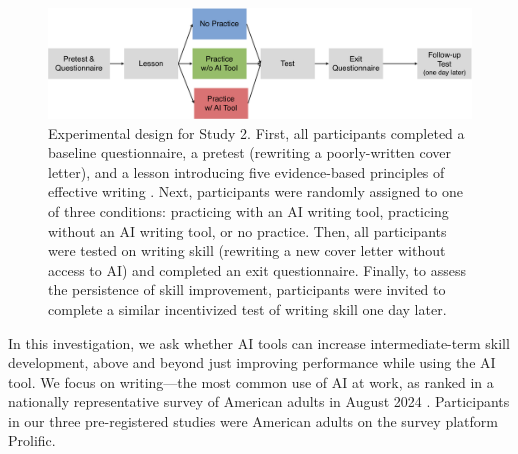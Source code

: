 \documentclass[11pt]{report}
\begin{document}
\begin{mainf}
\begin{figure}[]
    \centering
    \includegraphics[width=.9\linewidth]{design_fig.pdf}
    \caption{Experimental design for Study 2. First, all participants completed a baseline questionnaire, a pretest (rewriting a poorly-written cover letter), and a lesson introducing five evidence-based principles of effective writing \cite{rogers2023}. Next, participants were randomly assigned to one of three conditions: practicing with an AI writing tool, practicing without an AI writing tool, or no practice. Then, all participants were tested on writing skill (rewriting a new cover letter without access to AI) and completed an exit questionnaire. Finally, to assess the persistence of skill improvement, participants were invited to complete a similar incentivized test of writing skill one day later.}
    \label{fig:design}
\end{figure}

In this investigation, we ask whether AI tools can increase intermediate-term skill development, above and beyond just improving performance while using the AI tool.
  We focus on writing---the most common use of AI at work, as ranked in a nationally representative survey of American adults in August 2024  \cite{bick2024rapid}. 
  Participants in our three pre-registered studies were American adults on the survey platform Prolific. 
  

\end{mainf}
\end{document}
